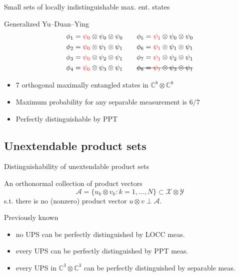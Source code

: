 \documentclass{beamer}
\def\X{\mathcal{X}}
\def\Y{\mathcal{Y}}
\def\A{\mathcal{A}}
\def\complex{\mathbb{C}}
\begin{document}
    \begin{frame}{Small sets of locally indistinguishable max. ent. states}
        \begin{block}{Generalized Yu--Duan--Ying}
            \begin{align*}
                \phi_{1} &= \textcolor{red}{\psi_{0}} \otimes \psi_{0}\otimes\psi_{0} 
                  \qquad \phi_{5} = \textcolor{red}{\psi_{1}} \otimes\psi_{0}\otimes\psi_{0}\\
                \phi_{2} &= \textcolor{red}{\psi_{0}} \otimes \psi_{1}\otimes\psi_{1} 
                  \qquad \phi_{6} = \textcolor{red}{\psi_{1}} \otimes\psi_{1}\otimes\psi_{1}\\
                \phi_{3} &= \textcolor{red}{\psi_{0}} \otimes \psi_{2}\otimes\psi_{1} 
                  \qquad \phi_{7} = \textcolor{red}{\psi_{1}} \otimes\psi_{2}\otimes\psi_{1}\\
                \phi_{4} &= \textcolor{red}{\psi_{0}} \otimes \psi_{3}\otimes\psi_{1} 
                  \qquad \text{\sout{\ensuremath{\phi_{8} = \textcolor{red}{\psi_{1}} \otimes\psi_{3}\otimes\psi_{1}}}}
            \end{align*}
        \end{block}
        \begin{itemize}
          \item $7$ orthogonal maximally entangled states in $\complex^{8}\otimes\complex^{8}$
          \item Maximum probability for any separable measurement is $6/7$ 
          \item Perfectly distinguishable by PPT
        \end{itemize}
    \end{frame}

  \subsection{Unextendable product sets}
    \begin{frame}{Distinguishability of unextendable product sets}    
        \begin{definition}
            An orthonormal collection of product vectors
            \[
              \A = \{ u_{k}\otimes v_{k} : k = 1, \ldots, N \} \subset \X \otimes \Y
            \]
            s.t. there is no (nonzero) product vector $u\otimes v \perp \A$.
        \end{definition}
        \begin{block}{Previously known}
            \begin{itemize}
                \item no UPS can be perfectly distinguished by LOCC meas.
                \item every UPS can be perfectly distinguished by PPT meas.
                \item every UPS in $\complex^{3}\otimes\complex^{3}$ can be perfectly distinguished by separable meas.
            \end{itemize}
        \end{block}
    \end{frame}
    
\end{document}
